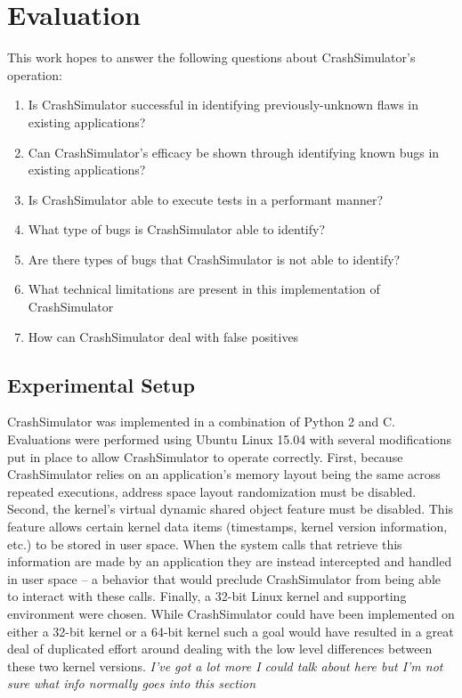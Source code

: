 \section{Evaluation}

    This work hopes to answer the following questions about CrashSimulator's operation:

        \begin{enumerate}
            \item{Is CrashSimulator successful in identifying previously-unknown flaws in existing applications?}
            \item{Can CrashSimulator's efficacy be shown through identifying known bugs in existing applications?}
            \item{Is CrashSimulator able to execute tests in a performant manner?}
            \item{What type of bugs is CrashSimulator able to identify?}
            \item{Are there types of bugs that CrashSimulator is not able to identify?}
            \item{What technical limitations are present in this implementation of CrashSimulator}
            \item{How can CrashSimulator deal with false positives}
        \end{enumerate}

    \subsection{Experimental Setup}

    CrashSimulator was implemented in a combination of Python 2 and C.  Evaluations were performed using Ubuntu Linux
    15.04 with several modifications put in place to allow CrashSimulator to operate correctly. First, because
    CrashSimulator relies on an application's memory layout being the same across repeated executions, address space
    layout randomization must be disabled.  Second, the kernel's virtual dynamic shared object feature must be
    disabled.  This feature allows certain kernel data items (timestamps, kernel version information, etc.) to be stored
    in user space.  When the system calls that retrieve this information are made by an application they are instead
    intercepted and handled in user space -- a behavior that would preclude CrashSimulator from being able to interact
    with these calls.  Finally, a 32-bit Linux kernel and supporting environment were chosen.  While CrashSimulator
    could have been implemented on either a 32-bit kernel or a 64-bit kernel such a goal would have resulted in a great
    deal of duplicated effort around dealing with the low level differences between these two kernel versions.
    \emph{I've got a lot more I could talk about here but I'm not sure what info normally goes into this section}

